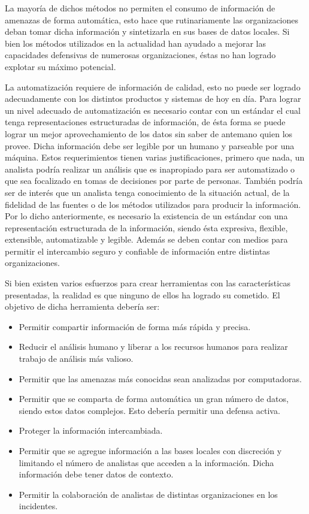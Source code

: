 La mayoría de dichos 
métodos no permiten el consumo de información de amenazas de forma automática, 
esto hace que rutinariamente las organizaciones deban tomar dicha información y 
sintetizarla en sus bases de datos locales. Si bien los métodos utilizados en la 
actualidad han ayudado a mejorar las capacidades defensivas de numerosas 
organizaciones, éstas no han logrado explotar su máximo potencial.

La automatización requiere de información de calidad, esto 
no puede ser logrado adecuadamente con los distintos productos y sistemas de hoy en 
día. Para lograr un nivel adecuado de automatización es necesario contar con un 
estándar el cual tenga representaciones estructuradas de información, de ésta 
forma se puede lograr un mejor aprovechamiento de los datos sin saber de 
antemano quien los provee. Dicha información debe ser legible por un humano y 
parseable por una máquina. Estos requerimientos tienen varias justificaciones, 
primero que nada, un analista podría realizar un análisis que es inapropiado 
para ser automatizado o que sea focalizado en tomas de decisiones por parte de 
personas. También podría ser de interés que un analista tenga conocimiento de la 
situación actual,  de la fidelidad de las fuentes o de los métodos utilizados 
para producir la información. Por lo dicho anteriormente, es necesario la 
existencia de un estándar con una representación estructurada de la información, siendo ésta 
expresiva, flexible, extensible, automatizable y legible. Además se deben contar 
con medios para permitir el intercambio seguro y confiable de información entre 
distintas organizaciones.

Si bien existen varios esfuerzos para crear herramientas con las características 
presentadas, la realidad es que ninguno de ellos ha logrado su cometido. El 
objetivo de dicha herramienta debería ser:
\begin{itemize}
  \item Permitir compartir información de forma más rápida y precisa.
  \item Reducir el análisis humano y liberar a los recursos humanos para 
  realizar trabajo de análisis más valioso.
  \item Permitir que las amenazas más conocidas sean analizadas por 
  computadoras.
  \item Permitir que se comparta de forma automática un gran número de datos, 
  siendo estos datos complejos. Esto debería permitir una defensa activa.
  \item Proteger la información intercambiada.
  \item Permitir que se agregue información a las bases locales con discreción y 
  limitando el número de analistas que acceden a la información. Dicha 
  información debe tener datos de contexto.
  \item Permitir la colaboración de analistas de distintas organizaciones en los 
  incidentes.
\end{itemize}
